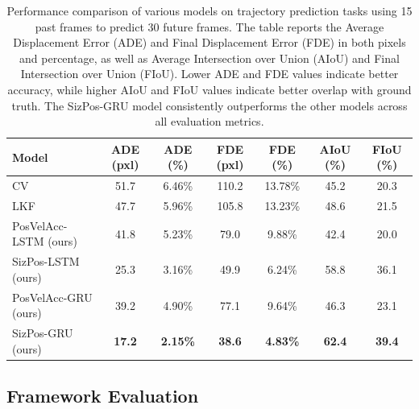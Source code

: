 \documentclass[12pt,oneside]{book} %
\begin{document}
\begin{table}[H]
    \centering
    \caption{Performance comparison of various models on trajectory prediction tasks using 15 past frames to predict 30 future frames. The table reports the Average Displacement Error (ADE) and Final Displacement Error (FDE) in both pixels and percentage, as well as Average Intersection over Union (AIoU) and Final Intersection over Union (FIoU). Lower ADE and FDE values indicate better accuracy, while higher AIoU and FIoU values indicate better overlap with ground truth. The SizPos-GRU model consistently outperforms the other models across all evaluation metrics.}
    \begin{adjustbox}{max width=\textwidth}
        \begin{tabular}{lcccccc}
            \toprule
            \textbf{Model}        & \textbf{ADE (pxl)} & \textbf{ADE (\%)} & \textbf{FDE (pxl)} & \textbf{FDE (\%)} & \textbf{AIoU (\%)} & \textbf{FIoU (\%)} \\ 
            \midrule
            CV                    & 51.7               & 6.46\%            & 110.2              & 13.78\%           & 45.2               & 20.3               \\
            LKF                   & 47.7               & 5.96\%            & 105.8              & 13.23\%           & 48.6               & 21.5               \\
            PosVelAcc-LSTM (ours) & 41.8               & 5.23\%            & 79.0               & 9.88\%            & 42.4               & 20.0               \\
            SizPos-LSTM (ours)    & 25.3               & 3.16\%            & 49.9               & 6.24\%            & 58.8               & 36.1               \\
            PosVelAcc-GRU (ours)  & 39.2               & 4.90\%            & 77.1               & 9.64\%            & 46.3               & 23.1               \\
            SizPos-GRU (ours)     & \textbf{17.2}      & \textbf{2.15\%}   & \textbf{38.6}      & \textbf{4.83\%}   & \textbf{62.4}      & \textbf{39.4}      \\
            \bottomrule
        \end{tabular}
    \end{adjustbox}
    \label{tab:fusion-gru-results-30frames}
\end{table}

\subsection{Framework Evaluation}
\end{document}
